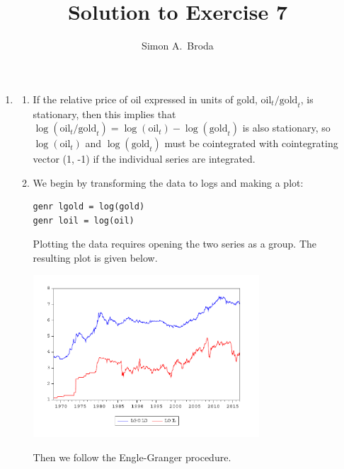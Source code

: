 \documentclass[11pt, a4paper]{article}
\begin{document}
\title{Solution to Exercise 7}
\author{Simon A.\ Broda}
\date{}
\maketitle

\begin{enumerate}


\item
\begin{enumerate}
\item If the relative price of oil expressed in units of gold, $\mbox{oil}_t/\mbox{gold}_t$, is stationary, then this implies that $\log(\mbox{oil}_t/\mbox{gold}_t)=\log (\mbox{oil}_t) - \log(\mbox{gold}_t)$ is also stationary, so $\log(\mbox{oil}_t)$ and $\log(\mbox{gold}_t)$ must be cointegrated with cointegrating vector (1, -1) if the individual series are integrated.
\item We begin by transforming the data to logs and making a plot:
\begin{verbatim}
genr lgold = log(gold)
genr loil = log(oil)
\end{verbatim}

Plotting the data requires opening the two series as a group. The resulting plot is given below.
\begin{center}\includegraphics[width=0.7\textwidth]{oilgold2017}\end{center}

Then we follow the Engle-Granger procedure.


\end{enumerate}
\end{enumerate}
\end{document}
